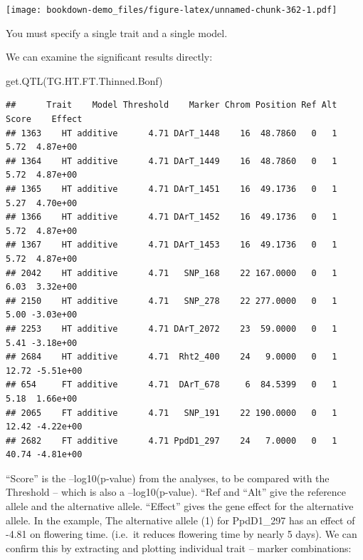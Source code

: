 \documentclass[
]{book}
\newenvironment{Shaded}{\begin{snugshade}}{\end{snugshade}}
\newcommand{\AttributeTok}[1]{\textcolor[rgb]{0.77,0.63,0.00}{#1}}
\newcommand{\FunctionTok}[1]{\textcolor[rgb]{0.00,0.00,0.00}{#1}}
\newcommand{\NormalTok}[1]{#1}
\newcommand{\SpecialCharTok}[1]{\textcolor[rgb]{0.00,0.00,0.00}{#1}}
\begin{document}
\texttt{[image: bookdown-demo\_files/figure-latex/unnamed-chunk-362-1.pdf]}

You must specify a single trait and a single model.

We can examine the significant results directly:

\begin{Shaded}
\begin{Highlighting}[]
\FunctionTok{get.QTL}\NormalTok{(TG.HT.FT.Thinned.Bonf)}
\end{Highlighting}
\end{Shaded}

\begin{verbatim}
##      Trait    Model Threshold    Marker Chrom Position Ref Alt Score    Effect
## 1363    HT additive      4.71 DArT_1448    16  48.7860   0   1  5.72  4.87e+00
## 1364    HT additive      4.71 DArT_1449    16  48.7860   0   1  5.72  4.87e+00
## 1365    HT additive      4.71 DArT_1451    16  49.1736   0   1  5.27  4.70e+00
## 1366    HT additive      4.71 DArT_1452    16  49.1736   0   1  5.72  4.87e+00
## 1367    HT additive      4.71 DArT_1453    16  49.1736   0   1  5.72  4.87e+00
## 2042    HT additive      4.71   SNP_168    22 167.0000   0   1  6.03  3.32e+00
## 2150    HT additive      4.71   SNP_278    22 277.0000   0   1  5.00 -3.03e+00
## 2253    HT additive      4.71 DArT_2072    23  59.0000   0   1  5.41 -3.18e+00
## 2684    HT additive      4.71  Rht2_400    24   9.0000   0   1 12.72 -5.51e+00
## 654     FT additive      4.71  DArT_678     6  84.5399   0   1  5.18  1.66e+00
## 2065    FT additive      4.71   SNP_191    22 190.0000   0   1 12.42 -4.22e+00
## 2682    FT additive      4.71 PpdD1_297    24   7.0000   0   1 40.74 -4.81e+00
\end{verbatim}

``Score'' is the --log10(p-value) from the analyses, to be compared with the Threshold -- which is also a --log10(p-value). ``Ref and ``Alt'' give the reference allele and the alternative allele. ``Effect'' gives the gene effect for the alternative allele. In the example, The alternative allele (1) for PpdD1\_297 has an effect of -4.81 on flowering time. (i.e.~it reduces flowering time by nearly 5 days). We can confirm this by extracting and plotting individual trait -- marker combinations:

\begin{Shaded}
\end{Shaded}
\end{document}
